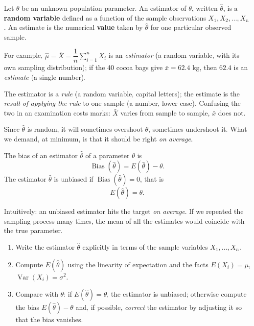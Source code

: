 \documentclass[11pt]{article}
\newcommand{\cle}[1]{{\popxbold\color{popdark}#1}}
\newcounter{popsec}
\newcounter{popsub}
\newcommand{\courssub}[1]{%
  \stepcounter{popsub}%
  \par\vspace{9pt}\noindent{\popxbold\fontsize{11.5}{13}\selectfont\color{popink}{\color{poporange}\thepopsec.\thepopsub}\hspace{6pt}#1}\par\nopagebreak\vspace{4pt}
}
\begin{document}
\begin{definition}
Let $\theta$ be an unknown population parameter. An \cle{estimator} of $\theta$, written $\hat{\theta}$, is a \textbf{random variable} defined as a function of the sample observations $X_{1}, X_{2}, \dots, X_{n}$. An \cle{estimate} is the numerical \textbf{value} taken by $\hat{\theta}$ for one particular observed sample.
\end{definition}

For example, $\hat{\mu} = \bar{X} = \dfrac{1}{n}\sum_{i=1}^{n} X_{i}$ is an \emph{estimator} (a random variable, with its own sampling distribution); if the 40 cocoa bags give $\bar{x} = 62.4$ kg, then $62.4$ is an \emph{estimate} (a single number).

\begin{attention}
The estimator is a \emph{rule} (a random variable, capital letters); the estimate is the \emph{result of applying the rule} to one sample (a number, lower case). Confusing the two in an examination costs marks: $\bar{X}$ varies from sample to sample, $\bar{x}$ does not.
\end{attention}

\courssub{Bias of an Estimator}

Since $\hat{\theta}$ is random, it will sometimes overshoot $\theta$, sometimes undershoot it. What we demand, at minimum, is that it should be right \emph{on average}.

\begin{definition}
The \cle{bias} of an estimator $\hat{\theta}$ of a parameter $\theta$ is
\[
\operatorname{Bias}(\hat{\theta}) = E(\hat{\theta}) - \theta.
\]
The estimator $\hat{\theta}$ is \cle{unbiased} if $\operatorname{Bias}(\hat{\theta}) = 0$, that is
\[
E(\hat{\theta}) = \theta.
\]
\end{definition}

Intuitively: an unbiased estimator hits the target \emph{on average}. If we repeated the sampling process many times, the mean of all the estimates would coincide with the true parameter.

\begin{methode}
\begin{enumerate}
\item Write the estimator $\hat{\theta}$ explicitly in terms of the sample variables $X_{1},\dots,X_{n}$.
\item Compute $E(\hat{\theta})$ using the linearity of expectation and the facts $E(X_{i})=\mu$, $\operatorname{Var}(X_{i})=\sigma^{2}$.
\item Compare with $\theta$: if $E(\hat{\theta})=\theta$, the estimator is unbiased; otherwise compute the bias $E(\hat{\theta})-\theta$ and, if possible, \emph{correct} the estimator by adjusting it so that the bias vanishes.
\end{enumerate}
\end{methode}
\end{document}
